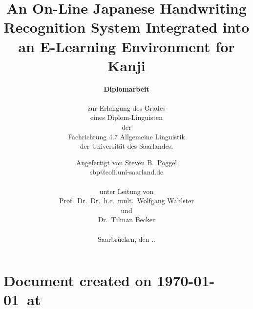 \documentclass[a4paper]{book}
\title{An On-Line Japanese Handwriting Recognition System Integrated into an E-Learning Environment for Kanji}
\author{\textbf{\large Diplomarbeit} \\
\textsc{ } \\
zur Erlangung des Grades \\
eines Diplom-Linguisten\\
der \\
Fachrichtung 4.7 Allgemeine Linguistik \\ 
der Universität des Saarlandes.}
\date{
Angefertigt von
Steven B.~Poggel\\
sbp@coli.uni-saarland.de \\
\textsc{ } \\
unter Leitung von \\
Prof.~Dr.~Dr.~h.c.~mult.~Wolfgang Wahlster \\
und \\
Dr.~Tilman Becker \\
\textsc{ } \\
Saarbrücken, den \the\day.\the\month.\the\year}
\begin{document}


\appendix

 \listoffigures
 \lstlistoflistings
 \listoftables
 
\chapter*{Document created on \today~at \xxivtime}
\end{document}
